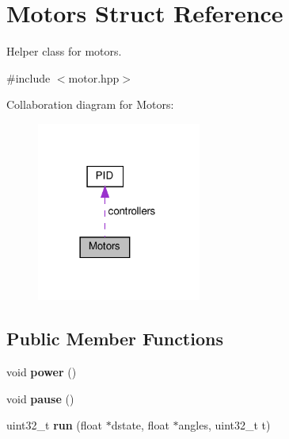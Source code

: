 \hypertarget{structMotors}{}\section{Motors Struct Reference}
\label{structMotors}


Helper class for motors.  




{\ttfamily \#include $<$motor.\+hpp$>$}



Collaboration diagram for Motors\+:\nopagebreak
\begin{figure}[H]
\begin{center}
\leavevmode
\includegraphics[width=153pt]{structMotors__coll__graph}
\end{center}
\end{figure}
\subsection*{Public Member Functions}
\begin{DoxyCompactItemize}
\item 
\mbox{\label{structMotors_ac6532a754e5f1743ee4975b6722b4054}} 
void {\bfseries power} ()
\item 
\mbox{\label{structMotors_a179c6a24115935994a13493f74f56df8}} 
void {\bfseries pause} ()
\item 
\mbox{\label{structMotors_a0d3909ec9fadbb3028368e7340a2e707}} 
uint32\+\_\+t {\bfseries run} (float $\ast$dstate, float $\ast$angles, uint32\+\_\+t t)
\end{DoxyCompactItemize}
